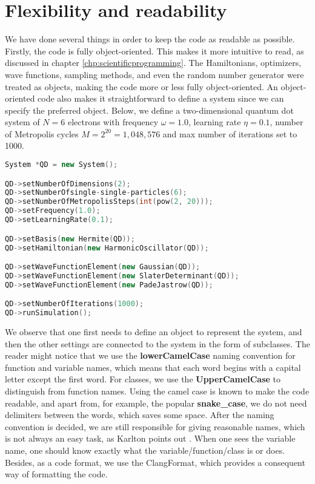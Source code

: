 \section{Flexibility and readability}
We have done several things in order to keep the code as readable as possible. Firstly, the code is fully object-oriented. This makes it more intuitive to read, as discussed in chapter \ref{chp:scientificprogramming}. The Hamiltonians, optimizers, wave functions, sampling methods, and even the random number generator were treated as objects, making the code more or less fully object-oriented. An object-oriented code also makes it straightforward to define a system since we can specify the preferred object. Below, we define a two-dimensional quantum dot system of $N=6$ electrons with frequency $\omega=1.0$, learning rate $\eta=0.1$, number of Metropolis cycles $M=2^{20}=1,048,576$ and max number of iterations set to 1000.

\begin{lstlisting}[language={C++}, caption={Example on how a quantum dot system can be initialized.}, label={lst:qd}]
System *QD = new System();

QD->setNumberOfDimensions(2);
QD->setNumberOfsingle-single-particles(6);
QD->setNumberOfMetropolisSteps(int(pow(2, 20)));
QD->setFrequency(1.0);
QD->setLearningRate(0.1);

QD->setBasis(new Hermite(QD));
QD->setHamiltonian(new HarmonicOscillator(QD));

QD->setWaveFunctionElement(new Gaussian(QD));
QD->setWaveFunctionElement(new SlaterDeterminant(QD));
QD->setWaveFunctionElement(new PadeJastrow(QD));

QD->setNumberOfIterations(1000);
QD->runSimulation();
\end{lstlisting}
We observe that one first needs to define an object to represent the system, and then the other settings are connected to the system in the form of subclasses. The reader might notice that we use the \textbf{lowerCamelCase} naming convention for function and variable names, which means that each word begins with a capital letter except the first word. For classes, we use the \textbf{UpperCamelCase} to distinguish from function names. Using the camel case is known to make the code readable, and apart from, for example, the popular \textbf{snake\_case}, we do not need delimiters between the words, which saves some space. After the naming convention is decided, we are still responsible for giving reasonable names, which is not always an easy task, as Karlton points out \supercite{fowler_bliki:_nodate}. When one sees the variable name, one should know exactly what the variable/function/class is or does. Besides, as a code format, we use the ClangFormat, which provides a consequent way of formatting the code. 

